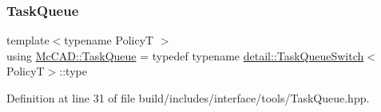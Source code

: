 \subsubsection{\texorpdfstring{Task\+Queue}{TaskQueue}}
{\footnotesize\ttfamily template$<$typename PolicyT $>$ \\
using \hyperlink{namespaceMcCAD_a3a236cdf837ceb7812628ff36fc0b95e}{Mc\+C\+A\+D\+::\+Task\+Queue} = typedef typename \hyperlink{structMcCAD_1_1detail_1_1TaskQueueSwitch}{detail\+::\+Task\+Queue\+Switch}$<$PolicyT$>$\+::type}



Definition at line 31 of file build/includes/interface/tools/\+Task\+Queue.\+hpp.

